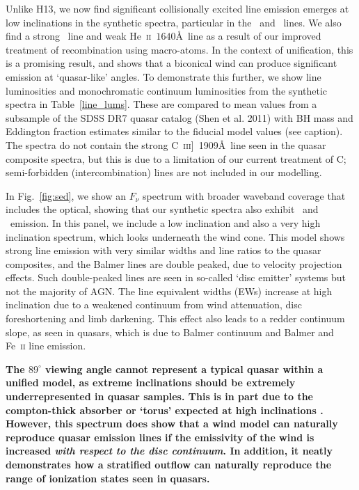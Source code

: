 \documentclass[useAMS,usenatbib]{mn2e_x}
\begin{document}
Unlike H13, we now find significant collisionally excited line emission emerges
at low inclinations in the synthetic spectra, particular in the \civ\ and \nv\
lines. We also find a strong \la\ line and weak He~\textsc{ii}~$1640$\AA\ line
as a result of our improved treatment of recombination using macro-atoms. 
In the context of unification, this is a promising result, 
and shows that a biconical wind can produce significant 
emission at `quasar-like' angles. To demonstrate this further,
we show line luminosities and monochromatic continuum luminosities
from the synthetic spectra in Table~\ref{line_lums}. These are compared to
mean values from a subsample of the SDSS DR7 quasar catalog (Shen et al. 2011) 
with BH mass and Eddington fraction estimates similar to the fiducial model values 
(see caption). The spectra do not contain the strong 
C~\textsc{iii}]~1909\AA\ line seen in the quasar composite spectra, 
but this is due to a limitation of our current treatment of C; semi-forbidden
(intercombination) lines are not included in our modelling.

In Fig.~\ref{fig:sed}, we show an $F_{\nu}$ spectrum with broader waveband coverage
that includes the optical, showing that our synthetic spectra 
also exhibit \ha\ and \hb\ emission. 
In this panel, we include a low inclination and 
also a very high inclination 
spectrum, which looks underneath the wind cone. This model shows 
strong line emission with very similar widths and line ratios to the quasar composites, and
the Balmer lines are double peaked, due to velocity projection effects.  
Such double-peaked lines are seen in so-called `disc emitter' systems 
\citep[e.g.][]{eracleous1994} but not the majority of AGN.     
The line equivalent widths (EWs) increase at high inclination
due to a weakened continuum from wind attenuation, 
disc foreshortening and limb darkening. This effect also 
leads to a redder continuum slope, as seen in quasars, which is
due to Balmer continuum and Balmer and Fe~\textsc{ii} line emission.

{\bf The $89^\circ$ viewing angle cannot represent a typical quasar within a unified model, as
extreme inclinations should be extremely underrepresented in quasar samples.
This is in part due to the compton-thick absorber or `torus' 
expected at high inclinations \cite[e.g.][]{antonucci1985,martinez2007}.
However, this spectrum does show that a wind model can
naturally reproduce quasar emission lines if the emissivity of the wind is 
increased {\em with respect to the disc continuum}.
In addition, it neatly demonstrates how a stratified outflow can naturally
reproduce the range of ionization states seen in quasars.}
\end{document}
